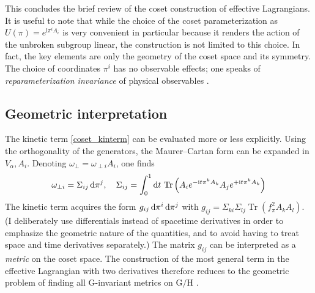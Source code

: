 \documentclass[final,3p,times,12pt,a4paper,sort&compress]{elsarticle}
\newcommand\gr[1]{\mathrm{#1}}              %
\newcommand\imag{\mathrm i}                 %
\newcommand\dd{\mathop{{\rm d}\!}\nolimits} %
\DeclareMathOperator{\Tr}{Tr}
\begin{document}
This concludes the brief review of the coset construction of effective
Lagrangians. It is useful to note that while the choice of the coset
parameterization as $U(\pi)=e^{\imag\pi^iA_i}$ is very convenient in particular
because it renders the action of the unbroken subgroup linear, the construction
is not limited to this choice. In fact, the key elements are only the geometry
of the coset space and its symmetry. The choice of coordinates $\pi^i$ has no
observable effects; one speaks of \emph{reparameterization invariance} of
physical observables \cite{Coleman:1969sm}.


\subsection{Geometric interpretation}
The kinetic term \eqref{coset_kinterm} can be evaluated more or less
explicitly. Using the orthogonality of the generators, the Maurer--Cartan form
can be expanded in $V_\alpha,A_i$. Denoting $\omega_\perp=\omega_{\perp i}A_i$,
one finds
\begin{equation}
\omega_{\perp i}=\Sigma_{ij}\dd\pi^j,\quad
\Sigma_{ij}=\int_0^1\dd t\,\Tr\left(
A_ie^{-\imag t\pi^kA_k}A_je^{+\imag t\pi^kA_k}
\right)
\end{equation}
The kinetic term acquires the form $g_{ij}\dd\pi^i\dd\pi^j$ with
$g_{ij}=\Sigma_{ki}\Sigma_{lj}\Tr(f_\pi^2A_kA_l)$. (I deliberately use
differentials instead of spacetime derivatives in order to emphasize the
geometric nature of the quantities, and to avoid having to treat space and
time derivatives separately.) The matrix $g_{ij}$ can be interpreted as a
\emph{metric} on the coset space. The construction of the most general term in
the effective Lagrangian with two derivatives therefore reduces to the
geometric problem of finding all $\gr G$-invariant metrics on $\gr{G/H}$
\cite{Leutwyler:1993gf,Leutwyler:1993iq}.
\end{document}
